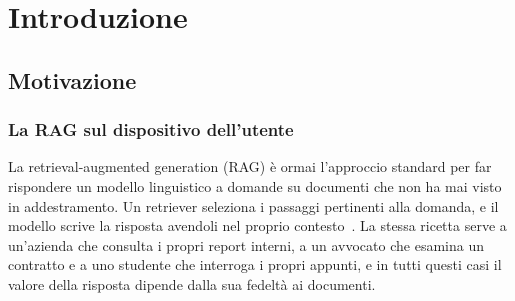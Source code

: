 \chapter{Introduzione}
\label{sec:introduction}


\section{Motivazione}
\label{sec:intro-motivation}

\subsection{La RAG sul dispositivo dell'utente}
\label{sec:intro-local}

La retrieval-augmented generation (RAG) è ormai l'approccio standard per far rispondere un modello linguistico a domande
su documenti che non ha mai visto in addestramento. Un retriever seleziona i passaggi pertinenti alla domanda, e il
modello scrive la risposta avendoli nel proprio contesto~\cite{lewis2020rag}. La stessa ricetta serve a un'azienda che
consulta i propri report interni, a un avvocato che esamina un contratto e a uno studente che interroga i propri appunti,
e in tutti questi casi il valore della risposta dipende dalla sua fedeltà ai documenti.

